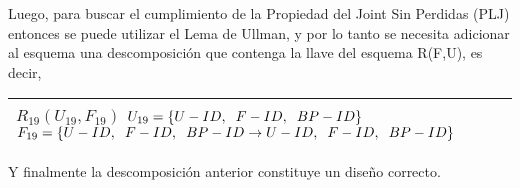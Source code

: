 \documentclass{report}
\begin{document}
    Luego, para buscar el cumplimiento de la Propiedad del Joint Sin Perdidas (PLJ) entonces se puede utilizar el 
    Lema de Ullman, y por lo tanto se necesita adicionar al esquema una descomposición que contenga la llave del 
    esquema R(F,U), es decir, \\

   
    \begin{tabularx}{\textwidth}{|X|}
        \toprule
        $ R_{19} ( U_{19} , F_{19} ) $ \newline 
        $ U_{19} = \{U-ID, \hspace{0.2cm} F-ID, \hspace{0.2cm} BP-ID \} $ \newline 
        $ F_{19} = \{U-ID, \hspace{0.2cm} F-ID, \hspace{0.2cm} BP-ID \rightarrow U-ID , \hspace{0.2cm} F-ID, \hspace{0.2cm} BP-ID \} $\\    
        \bottomrule
    \end{tabularx}

    \vspace*{0.5cm}

    Y finalmente la descomposición anterior constituye un diseño correcto.
\end{document}
